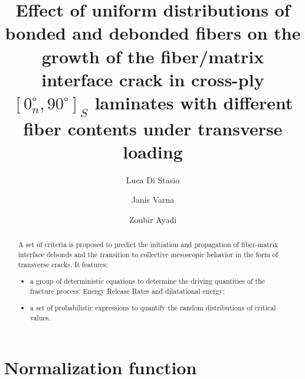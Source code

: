 \documentclass[review]{elsarticle}
\begin{document}
\begin{frontmatter}

\title{Effect of uniform distributions of bonded and debonded fibers on the growth of the fiber/matrix interface crack in cross-ply $\left[0^{\circ}_{n},90^{\circ}\right]_{S}$ laminates with different fiber contents under transverse loading}


\author[nancy,lulea]{Luca Di Stasio}
\author[lulea]{Janis Varna}
\author[nancy]{Zoubir Ayadi}


\address[nancy]{Universit\'e de Lorraine, EEIGM, IJL, 6 Rue Bastien Lepage, F-54010 Nancy, France}
\address[lulea]{Lule\aa\ University of Technology, University Campus, SE-97187 Lule\aa, Sweden}

\begin{abstract}
A set of criteria is proposed to predict the initiation and propagation of fiber-matrix interface debonds and the transition to collective mesoscopic behavior in the form of transverse cracks. It features:
\begin{itemize}
\item a group of deterministic equations to determine the driving quantities of the fracture process: Energy Release Rates and dilatational energy;
\item a set of probabilistic expressions to quantify the random distributions of critical values.
\end{itemize}
\end{abstract}


\end{frontmatter}

\linenumbers

\section{Normalization function}
\end{document}
